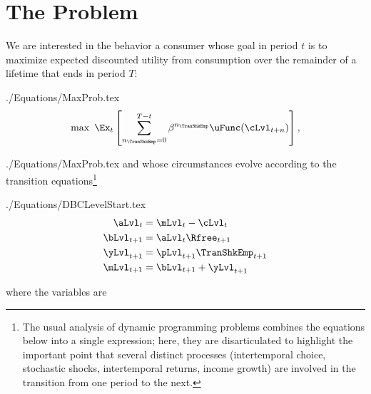 \documentclass[titlepage, headings=optiontotocandhead]{\econtex}
\begin{document}
\section{The Problem}\label{sec:basicproblem}
We are interested in the behavior a consumer whose goal in period $t$ is to
maximize expected discounted utility from consumption over the remainder of a
lifetime that ends in period $T$:
\begin{verbatimwrite}{./Equations/MaxProb.tex}
  \begin{equation}\label{eq:MaxProb}
    \max ~ \Ex_{t}\left[ \sum_{n_{\TranShkEmp}=0}^{T-t} {\DiscAlt}^{n_{\TranShkEmp}} \uFunc({\cLvl}_{t+n})\right],
  \end{equation}
\end{verbatimwrite}
 {./Equations/MaxProb.tex}
and whose circumstances evolve according to the transition equations\footnote{The usual analysis of dynamic programming problems combines the equations below into a single expression; here, they are disarticulated to highlight the important point that several distinct processes (intertemporal choice, stochastic shocks, intertemporal returns, income growth) are involved in the transition from one period to the next.}
\begin{verbatimwrite}{./Equations/DBCLevelStart.tex}
  \begin{equation}\begin{gathered}\begin{aligned}
        {\aLvl}_{t}  & = \mLvl_{t}-\cLvl_{t} \label{DBCLevel}%
        \\  {\bLvl}_{t+1}  & = {\aLvl}_{t} \Rfree_{t+1}
        \\  {\yLvl}_{t+1}  & = \pLvl_{t+1}\TranShkEmp_{t+1}
        \\  {\mLvl}_{t+1}  & = {\bLvl}_{t+1} + {\yLvl}_{t+1} %
      \end{aligned}\end{gathered}\end{equation}
\end{verbatimwrite}

where the variables are
\end{document}
